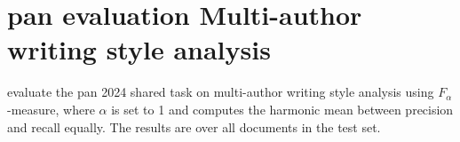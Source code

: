 \section{\acs{pan} evaluation Multi-author writing style analysis}
\label{sec:pan_evaluation_multi_author_writing_style_analysis}

\citet{zangerle_overview_2024} evaluate the \acs{pan} 2024 shared task on multi-author writing style analysis using 
$F_\alpha$-measure, where $\alpha$ is set to 1 and computes the harmonic mean between precision and recall equally.
The results are  over all documents in the test set.